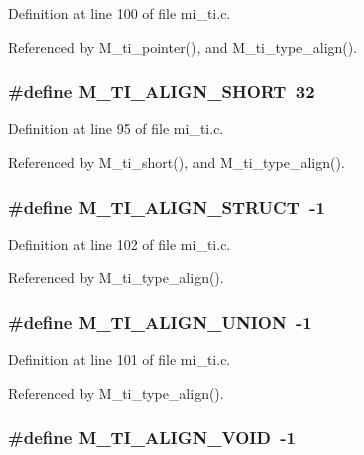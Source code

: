 Definition at line 100 of file mi\_\-ti.c.

Referenced by M\_\-ti\_\-pointer(), and M\_\-ti\_\-type\_\-align().
\subsubsection{\setlength{\rightskip}{0pt plus 5cm}\#define M\_\-TI\_\-ALIGN\_\-SHORT~32}\label{mi__ti_8c_cbc3151133b73e5957fd78f4f2ead7ef}




Definition at line 95 of file mi\_\-ti.c.

Referenced by M\_\-ti\_\-short(), and M\_\-ti\_\-type\_\-align().
\subsubsection{\setlength{\rightskip}{0pt plus 5cm}\#define M\_\-TI\_\-ALIGN\_\-STRUCT~-1}\label{mi__ti_8c_add91d4370032f4630acf8d95f2192eb}




Definition at line 102 of file mi\_\-ti.c.

Referenced by M\_\-ti\_\-type\_\-align().
\subsubsection{\setlength{\rightskip}{0pt plus 5cm}\#define M\_\-TI\_\-ALIGN\_\-UNION~-1}\label{mi__ti_8c_72ea3c60f3363eeef12bb26d96e78a26}




Definition at line 101 of file mi\_\-ti.c.

Referenced by M\_\-ti\_\-type\_\-align().
\subsubsection{\setlength{\rightskip}{0pt plus 5cm}\#define M\_\-TI\_\-ALIGN\_\-VOID~-1}\label{mi__ti_8c_55c9385ed967b337ab735f73000278ba}




